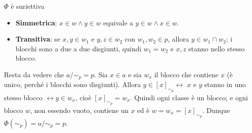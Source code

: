 \begin{concetto}
\begin{dimostrazione}
\begin{caso}{$\Phi$ è suriettiva}
\begin{itemize}
            \item[] \textbf{Simmetrica}: $x \in w \wedge y \in w$ equivale a $y \in w \wedge x \in w$.
            \item[] \textbf{Transitiva}: se $x, y \in w_1$ e $y, z \in w_2$ con $w_1, w_2 \in p$, allora $y \in w_1 \cap w_2$; i blocchi
                    sono a due a due disgiunti, quindi $w_1 = w_2$ e $x, z$ stanno nello stesso blocco.
        \end{itemize}
        Resta da vedere che $a/{\sim_p} = p$. Sia $x \in a$ e sia $w_x$ il blocco che contiene $x$ (è unico, perché i blocchi sono
        disgiunti). Allora $y \in [x]_{\sim_p} \leftrightarrow$ $x$ e $y$ stanno in uno stesso blocco $\leftrightarrow y \in w_x$, cioè
        $[x]_{\sim_p} = w_x$. Quindi ogni classe è un blocco; e ogni blocco $w$, non essendo vuoto, contiene un $x$ ed è $w = w_x = [x]_{\sim_p}$.
        Dunque $\Phi(\sim_p) = a/{\sim_p} = p$.
    \end{caso}
\end{dimostrazione}
\end{concetto}

